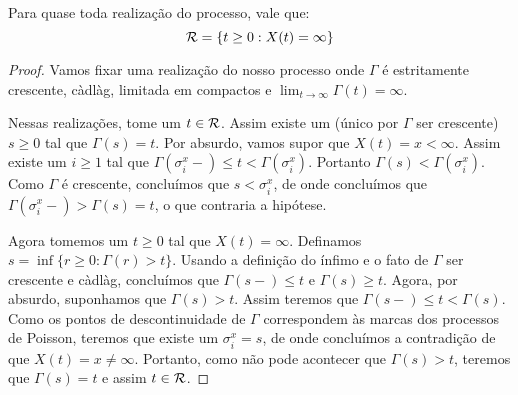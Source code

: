 \begin{proposicao}
  Para quase toda realização do processo, vale que:
  \begin{displaymath}
    {\mathcal{R}} = \left\{ t \geq 0: X(t) = \infty \right\}
  \end{displaymath}
\end{proposicao}
\begin{proof}
  Vamos fixar uma realização do nosso processo onde $\Gamma$ é
  estritamente crescente, càdlàg, limitada em compactos e $\lim_{t \to
    \infty} \Gamma(t) = \infty$.

  Nessas realizações, tome um $t \in {\mathcal{R}}$. Assim existe um (único por
  $\Gamma$ ser crescente) $s \geq 0$ tal que $\Gamma(s) = t$. Por
  absurdo, vamos supor que $X(t) = x < \infty$. Assim existe um $i
  \geq 1$ tal que $\Gamma(\sigma_i^x -) \leq t <
  \Gamma(\sigma_i^x)$. Portanto $\Gamma(s) < \Gamma(\sigma_i^x)$. Como
  $\Gamma$ é crescente, concluímos que $s < \sigma_i^x$, de onde
  concluímos que $\Gamma(\sigma_i^x-) > \Gamma(s) = t$, o que
  contraria a hipótese.

  Agora tomemos um $t \geq 0$ tal que $X(t) = \infty$. Definamos $s =
  \inf \{ r \geq 0 : \Gamma(r) > t \}$. Usando a definição do ínfimo e
  o fato de $\Gamma$ ser crescente e càdlàg, concluímos que
  $\Gamma(s-) \leq t$ e $\Gamma(s) \geq t$. Agora, por absurdo,
  suponhamos que $\Gamma(s) > t$. Assim teremos que $\Gamma(s-) \leq t
  < \Gamma(s)$. Como os pontos de descontinuidade de $\Gamma$
  correspondem às marcas dos processos de Poisson, teremos que existe
  um $\sigma_i^x = s$, de onde concluímos a contradição de que $X(t) =
  x \neq \infty$. Portanto, como não pode acontecer que $\Gamma(s) >
  t$, teremos que $\Gamma(s) = t$ e assim $t \in {\mathcal{R}}$.
\end{proof}

